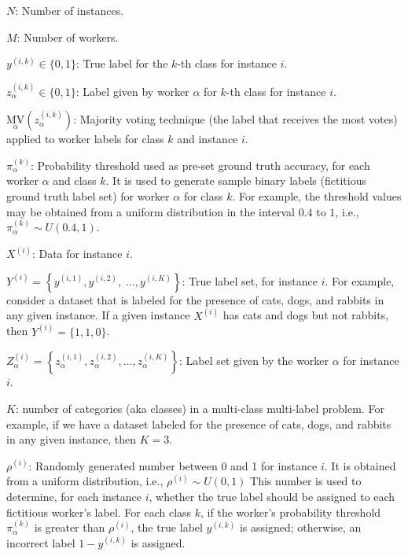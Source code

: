 \begin{itemize}{
    \setlength{\parindent}{1.5em}
    \item  $N$: Number of instances.
    \item  $M$: Number of workers.
    \item  $y^{(i,k)} \in \{0,1\} $: True label for the $k $-th class for instance $i $.
    \item  $z_\alpha^{(i,k)} \in \{0,1\} $: Label given by worker $\alpha $ for $k $-th class for instance $i $.
    \item  ${{\underset\alpha{\mathrm{MV}}}{\left(z_\alpha^{(i,k)}\right)}} $: Majority voting technique (the label that receives the most votes) applied to worker labels for class $k $ and instance $i $.
    \item  $\pi_\alpha^{(k)} $: Probability threshold used as pre-set ground truth accuracy, for each worker $\alpha$ and class $k$. It is used to generate sample binary labels (fictitious ground truth label set) for worker $\alpha $ for class $k $. For example, the threshold values may be obtained from a uniform distribution in the interval $0.4 $ to $1 $, i.e., $\pi_\alpha^{(k)} \sim U(0.4,1) $.
    \item  $X^{(i)} $: Data for instance $i$.
    \item  $Y^{(i)}=\left\{y^{(i,1)},y^{(i,2)},\;\dots,y^{(i,K)}\right\} $: True label set, for instance $i $. For example, consider a dataset that is labeled for the presence of cats, dogs, and rabbits in any given instance. If a given instance $X^{(i)} $ has cats and dogs but not rabbits, then $Y^{(i)}=\{1,1,0\} $.
    \item  $Z_{\alpha}^{(i)}=\left\{z_\alpha^{(i,1)}, z_\alpha^{(i,2)}, \dots, z_\alpha^{(i,K)}\right\} $: Label set given by the worker $\alpha $ for instance $i $.
    \item $K$: number of categories (aka classes) in a multi-class multi-label problem. For example, if we have a dataset labeled for the presence of cats, dogs, and rabbits in any given instance, then $K=3$.
    \item  $\rho^{(i)}$: Randomly generated number  between 0 and 1 for instance $i $. It is obtained from a uniform distribution, i.e., $\rho^{(i)} \sim U(0,1) $ This number is used to determine, for each instance $i$, whether the true label should be assigned to each fictitious worker's label. For each class $k$, if the worker's probability threshold $\pi_\alpha^{(k)}$ is greater than $\rho^{(i)}$, the true label $y^{(i,k)}$ is assigned; otherwise, an incorrect label $1 - y^{(i,k)}$  is assigned.
}
\end{itemize}
